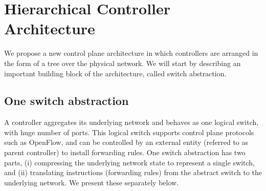 \documentclass[10pt, twocolumn]{article}
\begin{document}
\section{Hierarchical Controller Architecture}
\label{sec:hierarchical}
We propose a new control plane architecture in which controllers are arranged in the form of a tree over the physical network. We will start by describing an important building block of the architecture, called switch abstraction.

\subsection{One switch abstraction}
\label{subsec:aggr}
A controller aggregates its underlying network and behaves as one logical switch, with huge number of ports. This logical switch supports control plane protocols such as OpenFlow\cite{openflow,of-spec}, and can be controlled by an external entity (referred to as parent controller) to install forwarding rules. One switch abstraction has two parts, (i) compressing the underlying network state to represent a single switch, and (ii) translating instructions (forwarding rules) from the abstract switch to the underlying network. We present these separately below.
\end{document}
